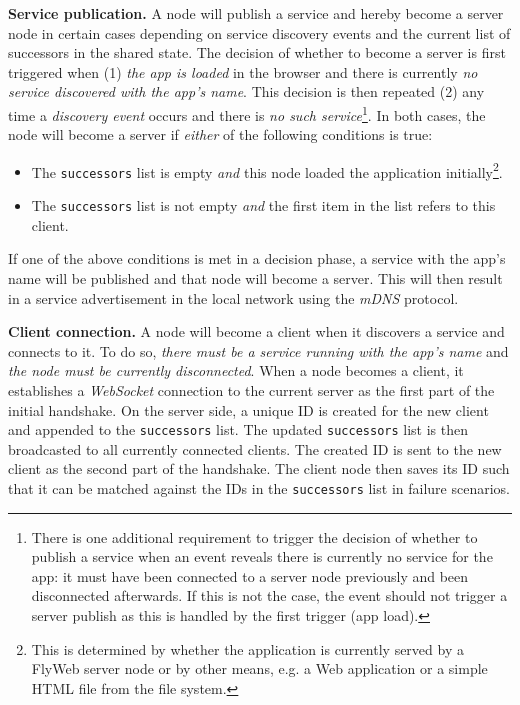\noindent\textbf{Service publication.}
A \APIshort node will publish a service and hereby become a server node in certain cases depending on service discovery events and the current list of successors in the shared state. 
The decision of whether to become a server is first triggered when (1) \textit{the app is loaded} in the browser and there is currently \textit{no service discovered with the app's name}. 
This decision is then repeated (2) any time a \textit{discovery event} occurs and there is \textit{no such service}\footnote{There is one additional requirement to trigger the decision of whether to publish a service when an event reveals there is currently no service for the app: it must have been connected to a server node previously and been disconnected afterwards. 
If this is not the case, the event should not trigger a server publish as this is handled by the first trigger (app load).}. 
In both cases, the node will become a server if \textit{either} of the following conditions is true:
\begin{itemize}
    \item The \texttt{successors} list is empty \textit{and} this node loaded the application initially\footnote{This is determined by whether the application is currently served by a FlyWeb server node or by other means, e.g. a Web application or a simple HTML file from the file system.}.
    \item The \texttt{successors} list is not empty \textit{and} the first item in the list refers to this client.
\end{itemize}

If one of the above conditions is met in a decision phase, a service with the app's name will be published and that node will become a server. This will then result in a service advertisement  in the local network using the \textit{mDNS} protocol. 




\noindent\textbf{Client connection.}
A \APIshort node will become a client when it discovers a service and connects to it.
To do so, \textit{there must be a \APIshort service running with the app's name} and \textit{the node must be currently disconnected}. 
When a node becomes a client, it establishes a \textit{WebSocket} connection to the current server as the first part of the initial handshake. 
On the server side, a unique ID is created for the new client and appended to the \texttt{successors} list. 
The updated \texttt{successors} list is then broadcasted to all currently connected clients. 
The created ID is sent to the new client as the second part of the handshake.
The client node then saves its ID such that it can be matched against the IDs in the \texttt{successors} list in failure scenarios.


